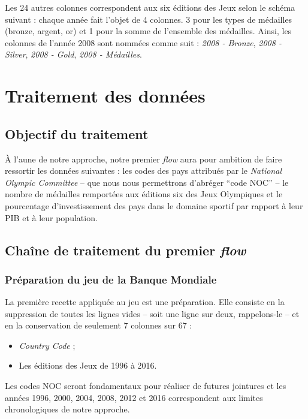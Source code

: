\documentclass[hidelinks, 12pt]{article}
\begin{document}
Les 24 autres colonnes correspondent aux six éditions des Jeux selon le schéma suivant : chaque année fait l'objet de 4 colonnes. 3 pour les types de médailles (bronze, argent, or) et 1 pour la somme de l'ensemble des médailles. Ainsi, les colonnes de l'année 2008 sont nommées comme suit : \textit{2008 - Bronze}, \textit{2008 - Silver}, \textit{2008 - Gold}, \textit{2008 - Médailles}.





%

























\section{Traitement des données}

\subsection{Objectif du traitement}

À l'aune de notre approche, notre premier \emph{flow} aura pour ambition de faire ressortir les données suivantes : les codes des pays attribués par le \emph{National Olympic Committee} -- que nous nous permettrons d'abréger \enquote{code NOC} -- le nombre de médailles remportées aux éditions six des Jeux Olympiques et le pourcentage d'investissement des pays dans le domaine sportif par rapport à leur PIB et à leur population.


\subsection{Chaîne de traitement du premier \emph{flow}}

\subsubsection{Préparation du jeu de la Banque Mondiale}

La première recette appliquée au jeu est une préparation. Elle consiste en la suppression de toutes les lignes vides -- soit une ligne sur deux, rappelons-le -- et en la conservation de seulement 7 colonnes sur 67 :
\begin{itemize}
	\item \emph{Country Code} ;
	\item Les éditions des Jeux de 1996 à 2016.
\end{itemize}
Les codes NOC seront fondamentaux pour réaliser de futures jointures et les années 1996, 2000, 2004, 2008, 2012 et 2016 correspondent aux limites chronologiques de notre approche.
\end{document}
